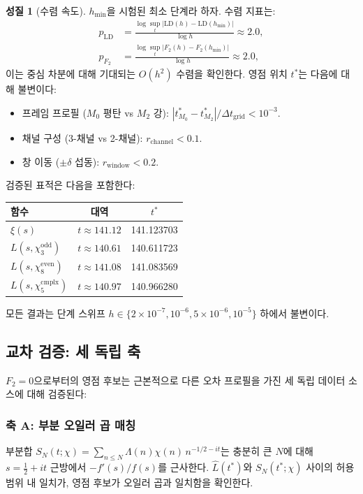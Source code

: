 \documentclass[11pt, a4paper]{article}
\theoremstyle{definition}
\newtheorem{property}{성질}[section]
\theoremstyle{plain}
\newcommand{\xif}{\xi}
\newcommand{\Lhat}{\hat{L}}
\begin{document}
\begin{property}[수렴 속도]
\label{prop:convergence}
$h_{\min}$을 시험된 최소 단계라 하자. 수렴 지표는:
\begin{align}
  p_{\mathrm{LD}} &= \frac{\log\sup_t|\mathrm{LD}(h) - \mathrm{LD}(h_{\min})|}
  {\log h} \approx 2.0, \label{eq:conv_ld}\\
  p_{F_2} &= \frac{\log\sup_t|F_2(h) - F_2(h_{\min})|}
  {\log h} \approx 2.0, \label{eq:conv_f2}
\end{align}
이는 중심 차분에 대해 기대되는 $O(h^2)$ 수렴을 확인한다. 영점 위치 $t^*$는 다음에 대해 불변이다:
\begin{itemize}
  \item 프레임 프로필 ($M_0$ 평탄 vs $M_2$ 강): $|t^*_{M_0} - t^*_{M_2}| / \Delta t_{\mathrm{grid}} < 10^{-3}$.
  \item 채널 구성 (3-채널 vs 2-채널): $r_{\mathrm{channel}} < 0.1$.
  \item 창 이동 ($\pm\delta$ 섭동): $r_{\mathrm{window}} < 0.2$.
\end{itemize}
\end{property}

검증된 표적은 다음을 포함한다:
\begin{center}
\begin{tabular}{lcc}
\toprule
\textbf{함수} & \textbf{대역} & \textbf{$t^*$} \\
\midrule
$\xif(s)$ & $t \approx 141.12$ & 141.123703 \\
$L(s,\chi_3^{\mathrm{odd}})$ & $t \approx 140.61$ & 140.611723 \\
$L(s,\chi_8^{\mathrm{even}})$ & $t \approx 141.08$ & 141.083569 \\
$L(s,\chi_5^{\mathrm{cmplx}})$ & $t \approx 140.97$ & 140.966280 \\
\bottomrule
\end{tabular}
\end{center}
모든 결과는 단계 스위프 $h \in \{2\times10^{-7}, 10^{-6}, 5\times10^{-6}, 10^{-5}\}$ 하에서 불변이다.


\subsection{교차 검증: 세 독립 축}
\label{sec:cross_validation}

$F_2 = 0$으로부터의 영점 후보는 근본적으로 다른 오차 프로필을 가진 세 독립 데이터 소스에 대해 검증된다:

\subsubsection{축 A: 부분 오일러 곱 매칭}
부분합 $S_N(t;\chi) = \sum_{n \leq N}\Lambda(n)\chi(n)\, n^{-1/2-it}$는 충분히 큰 $N$에 대해 $s = \tfrac{1}{2}+it$ 근방에서 $-f'(s)/f(s)$를 근사한다. $\Lhat(t^*)$와 $S_N(t^*;\chi)$ 사이의 허용 범위 내 일치가, 영점 후보가 오일러 곱과 일치함을 확인한다.
\end{document}
